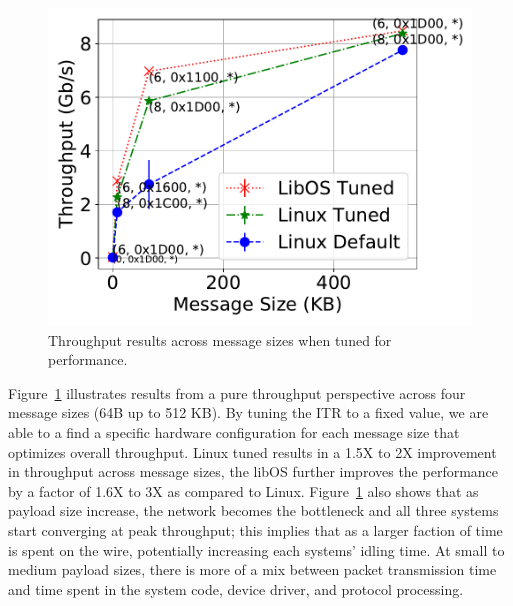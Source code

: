\begin{figure}[t]
  \includegraphics[width=\columnwidth]{osdi_figures/netpipe_tput.pdf}
  \caption{Throughput results across message sizes when tuned for performance.}
  \label{fig:netpipe_tput}
\end{figure}

Figure~\ref{fig:netpipe_tput} illustrates results from a pure throughput perspective across four message sizes (64B up to 512 KB).
By tuning the ITR to a fixed value, we are able to a find a specific hardware configuration for each message size that optimizes overall throughput.
Linux tuned results in a 1.5X to 2X improvement in throughput across message sizes, the libOS further improves the performance by a factor of 1.6X to 3X as compared to Linux. Figure~\ref{fig:netpipe_tput} also shows that as payload size increase, the network becomes the bottleneck and all three systems start converging at peak throughput; this implies that as a larger faction of time is spent on the wire, potentially increasing each systems' idling time. At small to medium payload sizes, there is more of a mix between packet transmission time and time spent in the system code, device driver, and protocol processing.

